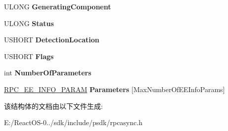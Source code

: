 \begin{DoxyCompactItemize}
\begin{tabbing}
\end{tabbing}\item 
\mbox{\label{structtag_r_p_c___e_x_t_e_n_d_e_d___e_r_r_o_r___i_n_f_o_a029493b8ab6b51f20e4d8d267b406a99}} 
U\+L\+O\+NG {\bfseries Generating\+Component}
\item 
\mbox{\label{structtag_r_p_c___e_x_t_e_n_d_e_d___e_r_r_o_r___i_n_f_o_ab95804dfbb6b52f752011edf0ebaae17}} 
U\+L\+O\+NG {\bfseries Status}
\item 
\mbox{\label{structtag_r_p_c___e_x_t_e_n_d_e_d___e_r_r_o_r___i_n_f_o_a4678171f956ac310d131201682d982ee}} 
U\+S\+H\+O\+RT {\bfseries Detection\+Location}
\item 
\mbox{\label{structtag_r_p_c___e_x_t_e_n_d_e_d___e_r_r_o_r___i_n_f_o_ab9c11871df169ed0c04afada118f88a9}} 
U\+S\+H\+O\+RT {\bfseries Flags}
\item 
\mbox{\label{structtag_r_p_c___e_x_t_e_n_d_e_d___e_r_r_o_r___i_n_f_o_a42a06b6211ffe571e629846f33cd5100}} 
int {\bfseries Number\+Of\+Parameters}
\item 
\mbox{\label{structtag_r_p_c___e_x_t_e_n_d_e_d___e_r_r_o_r___i_n_f_o_aaed7e08455aab325e7d3864ee9559502}} 
\hyperlink{structtag_r_p_c___e_e___i_n_f_o___p_a_r_a_m}{R\+P\+C\+\_\+\+E\+E\+\_\+\+I\+N\+F\+O\+\_\+\+P\+A\+R\+AM} {\bfseries Parameters} \mbox{[}Max\+Number\+Of\+E\+E\+Info\+Params\mbox{]}
\end{DoxyCompactItemize}


该结构体的文档由以下文件生成\+:\begin{DoxyCompactItemize}
\item 
E\+:/\+React\+O\+S-\/0../sdk/include/psdk/rpcasync.\+h\end{DoxyCompactItemize}
